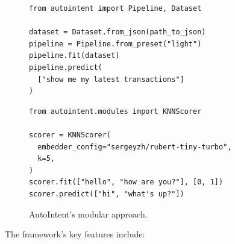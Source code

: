\begin{figure}[htbp]
    \centering
    \begin{minipage}{0.45\textwidth}  %
        \begin{verbatim}
from autointent import Pipeline, Dataset

dataset = Dataset.from_json(path_to_json)
pipeline = Pipeline.from_preset("light")
pipeline.fit(dataset)
pipeline.predict(
  ["show me my latest transactions"]
)
        \end{verbatim}
        \caption{Example usage of AutoIntent pipeline.}
        \label{fig:autointent_pipeline}
    \end{minipage}%
    \hfill
    \begin{minipage}{0.45\textwidth}  %
        \begin{verbatim}
from autointent.modules import KNNScorer

scorer = KNNScorer(
  embedder_config="sergeyzh/rubert-tiny-turbo",
  k=5,
)
scorer.fit(["hello", "how are you?"], [0, 1])
scorer.predict(["hi", "what's up?"])
        \end{verbatim}
        \caption{AutoIntent's modular approach.}
        \label{fig:knnscorer}
    \end{minipage}
\end{figure}

The framework's key features include:

